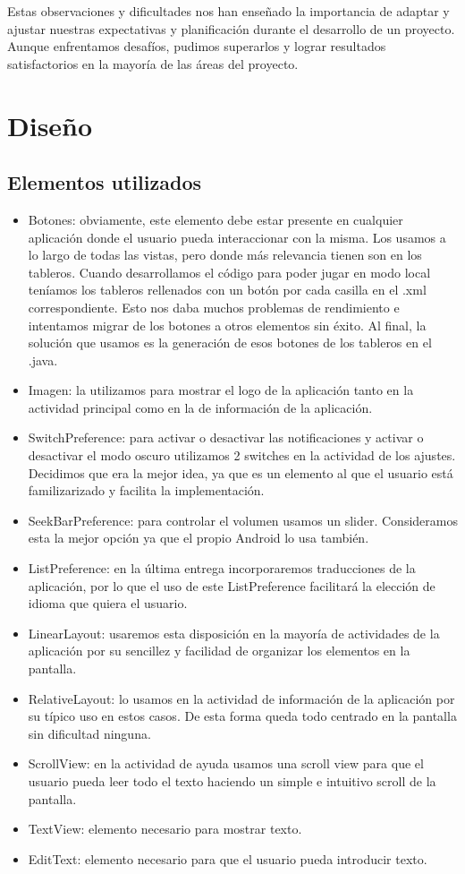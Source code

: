 \documentclass[a4paper, openright, 12pt]{article}
\begin{document}
Estas observaciones y dificultades nos han enseñado la importancia de adaptar y ajustar nuestras expectativas y planificación durante el desarrollo de un proyecto. Aunque enfrentamos desafíos, pudimos superarlos y lograr resultados satisfactorios en la mayoría de las áreas del proyecto.

\section{Diseño}
\subsection{Elementos utilizados}
\begin{itemize}
    \item Botones: obviamente, este elemento debe estar presente en cualquier aplicación donde el usuario pueda interaccionar con la misma. Los usamos a lo largo de todas las vistas, pero donde más relevancia tienen son en los tableros. Cuando desarrollamos el código para poder jugar en modo local teníamos los tableros rellenados con un botón por cada casilla en el .xml correspondiente. Esto nos daba muchos problemas de rendimiento e intentamos migrar de los botones a otros elementos sin éxito. Al final, la solución que usamos es la generación de esos botones de los tableros en el .java.
    \item Imagen: la utilizamos para mostrar el logo de la aplicación tanto en la actividad principal como en la de información de la aplicación.
    \item SwitchPreference: para activar o desactivar las notificaciones y activar o desactivar el modo oscuro utilizamos 2 switches en la actividad de los ajustes. Decidimos que era la mejor idea, ya que es un elemento al que el usuario está familizarizado y facilita la implementación.
    \item SeekBarPreference: para controlar el volumen usamos un slider. Consideramos esta la mejor opción ya que el propio Android lo usa también.
    \item ListPreference: en la última entrega incorporaremos traducciones de la aplicación, por lo que el uso de este ListPreference facilitará la elección de idioma que quiera el usuario.
    \item LinearLayout: usaremos esta disposición en la mayoría de actividades de la aplicación por su sencillez y facilidad de organizar los elementos en la pantalla.
    \item RelativeLayout: lo usamos en la actividad de información de la aplicación por su típico uso en estos casos. De esta forma queda todo centrado en la pantalla sin dificultad ninguna.
    \item ScrollView: en la actividad de ayuda usamos una scroll view para que el usuario pueda leer todo el texto haciendo un simple e intuitivo scroll de la pantalla.
    \item TextView: elemento necesario para mostrar texto.
    \item EditText: elemento necesario para que el usuario pueda introducir texto.
\end{itemize}
\end{document}
